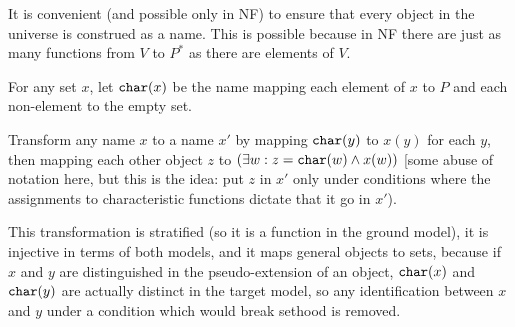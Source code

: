 \documentclass[12pt]{article}
\begin{document}
It is convenient (and possible only in NF) to ensure that every object in the universe is construed as a name.  This is possible because in NF there are just as many functions from $V$ to $P^*$ as there are elements of $V$.

For any set $x$, let ${\tt char}(x)$ be the name mapping each element of $x$ to $P$ and each non-element to the empty set.

Transform any name $x$ to a name $x'$ by mapping ${\tt char}(y)$ to $x(y)$ for each $y$, then mapping each other object $z$ to $(\exists w:z={\tt char}(w) \wedge x(w))$ [some abuse of notation here, but this is the idea:  put $z$ in $x'$ only under conditions where the assignments to characteristic functions dictate that it go in $x'$).

This transformation is stratified (so it is a function in the ground model), it is injective in terms of both models, and it maps general objects to sets, because if $x$ and $y$ are distinguished in the pseudo-extension of an object, ${\tt char}(x)$ and ${\tt char}(y)$ are actually distinct in the target model, so any identification between $x$ and $y$ under a condition which would break sethood is removed.
\end{document}
